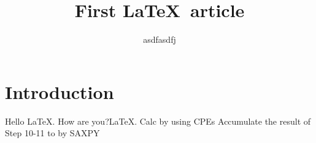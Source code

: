 \documentclass{article}
\title{First \LaTeX\ article}
\author{asdfasdfj}
\begin{document}
  
\section{Introduction}  
Hello \LaTeX. How are you?\LaTeX .
                    \State Calc   by using CPEs
                    \State Accumulate the result of Step 10-11 to by SAXPY
                \EndFor
  
\end{document}
